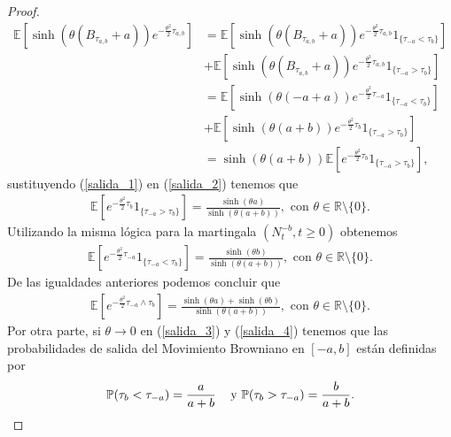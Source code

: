 \begin{proof}
\begin{align}
\mathbb{E} \left[ \sinh \left( \theta (B_{\tau_{a, b}} + a) \right) e^{- \frac{\theta^2}{2} \tau_{a, b}} \right] & = \mathbb{E} \left[ \sinh \left( \theta (B_{\tau_{a, b}} + a) \right) e^{- \frac{\theta^2}{2} \tau_{a, b}} 1_{ \{\tau_{-a} < \tau_{b} \}} \right] \nonumber \\
& + \mathbb{E} \left[ \sinh \left( \theta (B_{\tau_{a, b}} + a) \right) e^{- \frac{\theta^2}{2} \tau_{a, b}} 1_{ \{ \tau_{-a} > \tau_{b} \} } \right] \nonumber \\
& = \mathbb{E} \left[ \sinh \left( \theta (-a + a) \right) e^{- \frac{\theta^2}{2} \tau_{- a}} 1_{ \{\tau_{-a} < \tau_{b} \}} \right] \nonumber \\
& + \mathbb{E} \left[ \sinh \left( \theta (a+b) \right) e^{- \frac{\theta^2}{2} \tau_{b}} 1_{ \{ \tau_{-a} > \tau_{b} \} } \right] \nonumber \\
& = \sinh \left( \theta (a+b) \right) \mathbb{E} \left[ e^{- \frac{\theta^2}{2} \tau_{b}} 1_{ \{ \tau_{-a} > \tau_{b} \} } \right], \label{salida_2}
\end{align}
sustituyendo (\ref{salida_1}) en (\ref{salida_2}) tenemos que
\begin{align}
\mathbb{E} \left[ e^{- \frac{\theta^2}{2} \tau_{b}} 1_{ \{ \tau_{-a} > \tau_{b} \} } \right] = \frac{\sinh(\theta a)}{\sinh \left( \theta (a+b) \right)}, \text{  con  } \theta \in \mathbb{R} \setminus \{0\}. \label{salida_3}
\end{align}
Utilizando la misma lógica para la martingala $(N^{-b}_{t}, t \geq 0)$ obtenemos
\begin{align}
\mathbb{E} \left[ e^{- \frac{\theta^2}{2} \tau_{-a}} 1_{ \{ \tau_{-a} < \tau_{b} \} } \right] = \frac{\sinh(\theta b)}{\sinh \left( \theta (a+b) \right)}, \text{  con  } \theta \in \mathbb{R} \setminus \{0\}. \label{salida_4}
\end{align}
De las igualdades anteriores podemos concluir que 
\begin{align*}
\mathbb{E} \left[ e^{- \frac{\theta^2}{2} \tau_{-a} \wedge \tau_{b}} \right] = \frac{\sinh(\theta a) + \sinh(\theta b)}{\sinh \left( \theta (a+b) \right)}, \text{  con  } \theta \in \mathbb{R} \setminus \{0\}.
\end{align*}
Por otra parte, si $\theta \rightarrow 0$ en (\ref{salida_3}) y (\ref{salida_4}) tenemos que las probabilidades de salida del Movimiento Browniano en $[-a, b]$ están definidas por
\begin{align*}
\mathbb{P} (\tau_b < \tau_{-a}) = \frac{a}{a + b} \hspace{0.3cm} \text{ y } \mathbb{P} (\tau_b > \tau_{-a}) = \frac{b}{a + b}.

\end{align*}
\end{proof}
